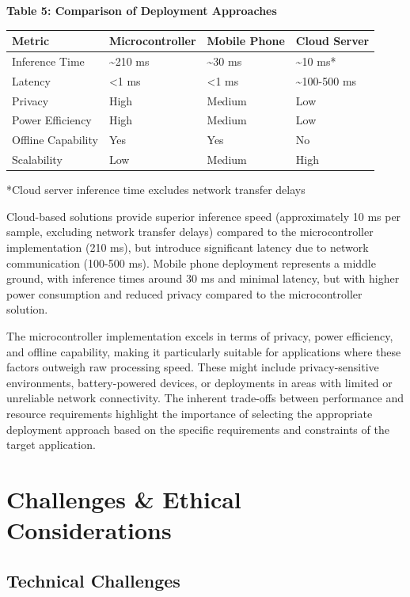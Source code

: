 \documentclass[
  9pt,
  letterpaper,
  abstract,
  titlepage]{scrbook}
\begin{document}
\textbf{Table 5: Comparison of Deployment Approaches}

\begin{longtable}[]{@{}llll@{}}
\toprule\noalign{}
Metric & Microcontroller & Mobile Phone & Cloud Server \\
\midrule\noalign{}
\endhead
\bottomrule\noalign{}
\endlastfoot
Inference Time & \textasciitilde210 ms & \textasciitilde30 ms &
\textasciitilde10 ms* \\
Latency & \textless1 ms & \textless1 ms & \textasciitilde100-500 ms \\
Privacy & High & Medium & Low \\
Power Efficiency & High & Medium & Low \\
Offline Capability & Yes & Yes & No \\
Scalability & Low & Medium & High \\
\end{longtable}

*Cloud server inference time excludes network transfer delays

Cloud-based solutions provide superior inference speed (approximately 10
ms per sample, excluding network transfer delays) compared to the
microcontroller implementation (210 ms), but introduce significant
latency due to network communication (100-500 ms). Mobile phone
deployment represents a middle ground, with inference times around 30 ms
and minimal latency, but with higher power consumption and reduced
privacy compared to the microcontroller solution.

The microcontroller implementation excels in terms of privacy, power
efficiency, and offline capability, making it particularly suitable for
applications where these factors outweigh raw processing speed. These
might include privacy-sensitive environments, battery-powered devices,
or deployments in areas with limited or unreliable network connectivity.
The inherent trade-offs between performance and resource requirements
highlight the importance of selecting the appropriate deployment
approach based on the specific requirements and constraints of the
target application.

\section{Challenges \& Ethical
Considerations}\label{challenges-ethical-considerations}

\subsection{Technical Challenges}\label{technical-challenges}
\end{document}
